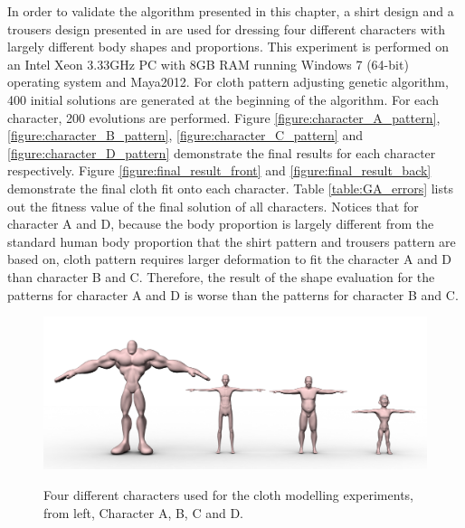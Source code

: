 In order to validate the algorithm presented in this chapter, a shirt design and a trousers design presented in  are used for dressing four different characters with largely different body shapes and proportions. This experiment is performed on an Intel Xeon 3.33GHz PC with 8GB RAM running Windows 7 (64-bit) operating system and Maya2012. For cloth pattern adjusting genetic algorithm, 400 initial solutions are generated at the beginning of the algorithm. For each character, 200 evolutions are performed. Figure \ref{figure:character_A_pattern}, \ref{figure:character_B_pattern}, \ref{figure:character_C_pattern} and \ref{figure:character_D_pattern} demonstrate the final results for each character respectively. Figure \ref{figure:final_result_front} and  \ref{figure:final_result_back} demonstrate the final cloth fit onto each character. Table \ref{table:GA_errors} lists out the fitness value of the final solution of all characters. Notices that for character A and D, because the body proportion is largely different from the standard human body proportion that the shirt pattern and trousers pattern are based on, cloth pattern requires larger deformation to fit the character A and D than character B and C. Therefore, the result of the shape evaluation for the patterns for character A and D is worse than the patterns for character B and C.

  
\begin{figure}[H]
	\centering
	\includegraphics[width=1.0\columnwidth]{../images/all_characters}\\[0.1cm]
    \caption[Characters]{Four different characters used for the cloth modelling experiments, from left, Character A, B, C and D.}
    \label{figure:all_characters}
\end{figure}


